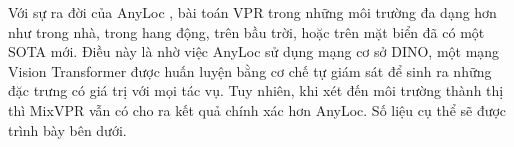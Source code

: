 Với sự ra đời của AnyLoc \cite{keetha2023anyloc}, bài toán VPR trong những môi trường đa dạng hơn như trong nhà, trong hang động, trên bầu trời, hoặc trên mặt biển đã có một SOTA mới. Điều này là nhờ việc AnyLoc sử dụng mạng cơ sở DINO, một mạng Vision Transformer được huấn luyện bằng cơ chế tự giám sát để sinh ra những đặc trưng có giá trị với mọi tác vụ. Tuy nhiên, khi xét đến môi trường thành thị thì MixVPR vẫn có cho ra kết quả chính xác hơn AnyLoc. Số liệu cụ thể sẽ được trình bày bên dưới.



\begin{table}[H]
\end{table}
